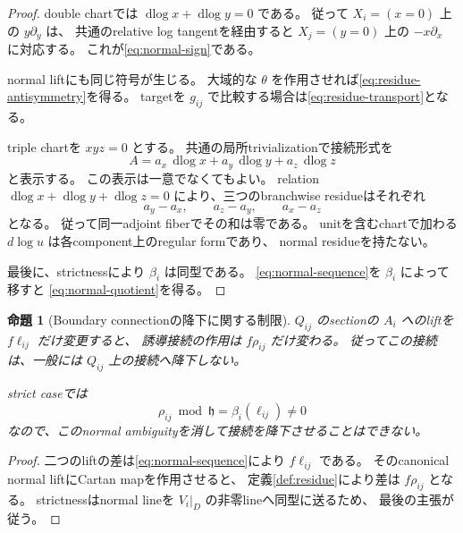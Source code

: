 \documentclass[uplatex,dvipdfmx,11pt]{jsarticle}
\numberwithin{equation}{section}
\theoremstyle{plain}
\newtheorem{proposition}[theorem]{命題}
\theoremstyle{definition}
\theoremstyle{remark}
\DeclareMathOperator{\dlog}{dlog}
\newcommand{\h}{\mathfrak h}
\begin{document}
\begin{proof}
double chartでは
\(\dlog x+\dlog y=0\) である。
従って \(X_i=(x=0)\) 上の \(y\partial_y\) は、
共通のrelative log tangentを経由すると
\(X_j=(y=0)\) 上の \(-x\partial_x\) に対応する。
これが\eqref{eq:normal-sign}である。

normal liftにも同じ符号が生じる。
大域的な \(\theta\) を作用させれば\eqref{eq:residue-antisymmetry}を得る。
targetを \(g_{ij}\) で比較する場合は\eqref{eq:residue-transport}となる。

triple chartを \(xyz=0\) とする。
共通の局所trivializationで接続形式を
\[
A=a_x\,\dlog x+a_y\,\dlog y+a_z\,\dlog z
\]
と表示する。
この表示は一意でなくてもよい。
relation
\(\dlog x+\dlog y+\dlog z=0\)
により、三つのbranchwise residueはそれぞれ
\[
a_y-a_x,\qquad a_z-a_y,\qquad a_x-a_z
\]
となる。
従って同一adjoint fiberでその和は零である。
unitを含むchartで加わる \(d\log u\) は各component上のregular formであり、
normal residueを持たない。

最後に、strictnessにより \(\beta_i\) は同型である。
\eqref{eq:normal-sequence}を \(\beta_i\) によって移すと
\eqref{eq:normal-quotient}を得る。
\end{proof}

\begin{proposition}[Boundary connectionの降下に関する制限]
\label{prop:no-boundary-connection}
\(Q_{ij}\) のsectionの \(A_i\) へのliftを \(f\ell_{ij}\) だけ変更すると、
誘導接続の作用は \(f\rho_{ij}\) だけ変わる。
従ってこの接続は、一般には \(Q_{ij}\) 上の接続へ降下しない。

strict caseでは
\[
\rho_{ij}\bmod\h=\beta_i(\ell_{ij})\ne0
\]
なので、このnormal ambiguityを消して接続を降下させることはできない。
\end{proposition}

\begin{proof}
二つのliftの差は\eqref{eq:normal-sequence}により \(f\ell_{ij}\) である。
そのcanonical normal liftにCartan mapを作用させると、
定義\ref{def:residue}により差は \(f\rho_{ij}\) となる。
strictnessはnormal lineを \(V_i|_D\) の非零lineへ同型に送るため、
最後の主張が従う。
\end{proof}
\end{document}
